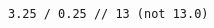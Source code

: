 \vspace{-2.25em}
\begin{center}
\begin{minipage}[t]{1\textwidth}
\begin{listing}[H]
\begin{spacing}{0.6}
\begin{verbatim}
3.25 / 0.25 // 13 (not 13.0)
\end{verbatim}
\end{spacing}
\end{listing}
\end{minipage}
\end{center}

